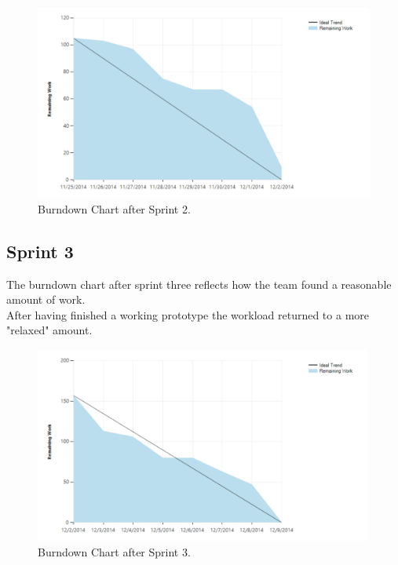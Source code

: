 \begin{figure}[H]
	\centering
	\includegraphics[scale=0.40]{Figures/Burndown2}
	\caption{Burndown Chart after Sprint 2.}
\end{figure}

\subsection{Sprint 3}
The burndown chart after sprint three reflects how the team found a reasonable amount of work. \\
After having finished a working prototype the workload returned to a more "relaxed" amount.

\begin{figure}[H]
	\centering
	\includegraphics[scale=0.40]{Figures/Burndown3}
	\caption{Burndown Chart after Sprint 3.}
\end{figure}